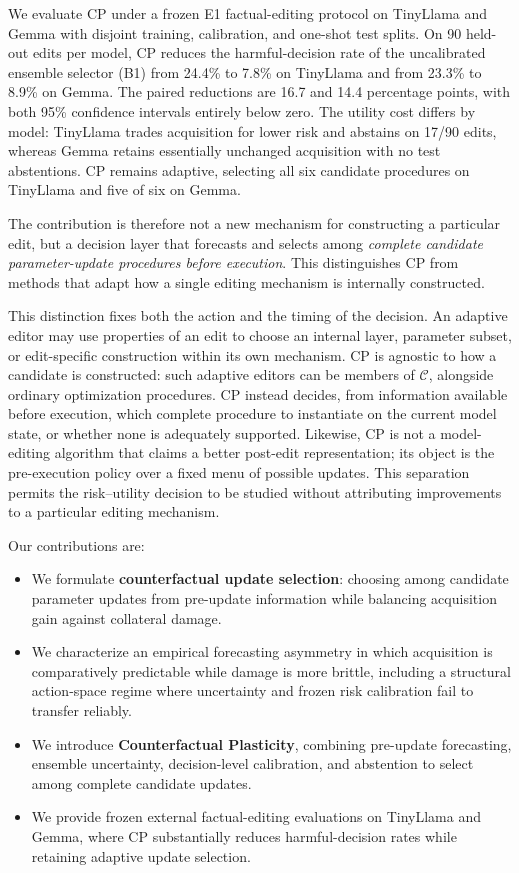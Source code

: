 \documentclass{article} %
\begin{document}
We evaluate CP under a frozen E1 factual-editing protocol on TinyLlama and
Gemma with disjoint training, calibration, and one-shot test splits. On 90
held-out edits per model, CP reduces the harmful-decision rate of the
uncalibrated ensemble selector (B1) from 24.4\% to 7.8\% on TinyLlama and from
23.3\% to 8.9\% on Gemma. The paired reductions are 16.7 and 14.4 percentage
points, with both 95\% confidence intervals entirely below zero. The utility
cost differs by model: TinyLlama trades acquisition for lower risk and
abstains on 17/90 edits, whereas Gemma retains essentially unchanged
acquisition with no test abstentions. CP remains adaptive, selecting all six
candidate procedures on TinyLlama and five of six on Gemma.

The contribution is therefore not a new mechanism for constructing a
particular edit, but a decision layer that forecasts and selects among
\emph{complete candidate parameter-update procedures before execution}. This
distinguishes CP from methods that adapt how a single editing mechanism is
internally constructed.

This distinction fixes both the action and the timing of the decision. An
adaptive editor may use properties of an edit to choose an internal layer,
parameter subset, or edit-specific construction within its own mechanism. CP
is agnostic to how a candidate is constructed: such adaptive editors can be
members of $\mathcal C$, alongside ordinary optimization procedures. CP instead
decides, from information available before execution, which complete procedure
to instantiate on the current model state, or whether none is adequately
supported. Likewise, CP is not a model-editing algorithm that claims a better
post-edit representation; its object is the pre-execution policy over a fixed
menu of possible updates. This separation permits the risk--utility decision
to be studied without attributing improvements to a particular editing
mechanism.

Our contributions are:
\begin{itemize}
    \item We formulate \textbf{counterfactual update selection}: choosing among
    candidate parameter updates from pre-update information while balancing
    acquisition gain against collateral damage.

    \item We characterize an empirical forecasting asymmetry in which
    acquisition is comparatively predictable while damage is more brittle,
    including a structural action-space regime where uncertainty and frozen
    risk calibration fail to transfer reliably.

    \item We introduce \textbf{Counterfactual Plasticity}, combining pre-update
    forecasting, ensemble uncertainty, decision-level calibration, and
    abstention to select among complete candidate updates.

    \item We provide frozen external factual-editing evaluations on TinyLlama
    and Gemma, where CP substantially reduces harmful-decision rates while
    retaining adaptive update selection.
\end{itemize}
\end{document}
